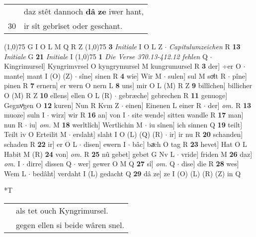 \documentclass[8pt,a4paper,notitlepage]{article}
\begin{document}
\begin{table}[ht]
\begin{minipage}[t]{0.5\linewidth}
\begin{tabular}{rl}
 & daz stêt dannoch \textbf{dâ} \textbf{ze} iwer hant,\\ 
30 & ir sît gebrîset oder geschant.\\ 
\end{tabular}
\scriptsize
\line(1,0){75} \newline
G I O L M Q R Z \newline
\line(1,0){75} \newline
\textbf{3} \textit{Initiale} I O L Z   $\cdot$ \textit{Capitulumzeichen} R  \textbf{13} \textit{Initiale} G  \textbf{21} \textit{Initiale} I  \newline
\line(1,0){75} \newline
\textbf{1} \textit{Die Verse 370.13-412.12 fehlen} Q   $\cdot$ Kingrimursel] Kyngrimvrsel O kyngrymursel M kungrumursel R \textbf{3} der] ÷er O  $\cdot$ mante] mant I (O) (Z)  $\cdot$ sîne] sinen R \textbf{4} wie] Wir M  $\cdot$ sulen] sul M soͯlt R  $\cdot$ pîne] pinen R \textbf{7} ernern] er wern O nern L \textbf{8} uns] mir O L (M) R Z \textbf{9} billîchen] billicher O (M) R Z \textbf{10} ellens] ellen O L (R)  $\cdot$ gebræche] gebrechen R \textbf{11} genuoge] Gegnvͦgen O \textbf{12} kuren] Nun R Kvm Z  $\cdot$ einen] Einenen L einer R  $\cdot$ der] \textit{om.} R \textbf{13} muoze] suln I  $\cdot$ wirz] wir R \textbf{16} an] von I  $\cdot$ site wende] sitten wandle R \textbf{17} man] nun R  $\cdot$ iu] \textit{om.} M \textbf{18} werltlîch] Wertlichin M  $\cdot$ iu sînen] ich sinnen Q \textbf{19} teilt] Teilt iv O Erteilit M  $\cdot$ erslaht] slaht I O (L) (Q) (R)  $\cdot$ ir] ir nu R \textbf{20} schanden] schaden R \textbf{22} ir] er O L  $\cdot$ disen] ewern I  $\cdot$ bâc] baͮch O tag R \textbf{23} hevet] Hat O L Habit M (R) \textbf{24} von] \textit{om.} R \textbf{25} nû gebet] gebet G Nv L  $\cdot$ vride] friden M \textbf{26} daz] \textit{om.} I  $\cdot$ dirre] dissen Q  $\cdot$ wer] gewer O M Q \textbf{27} sî] \textit{om.} Q  $\cdot$ dise] die R \textbf{28} wes] Wem L  $\cdot$ bedâht] verdaht I (L) gedacht Q \textbf{29} dâ ze] ze I (O) (L) (R) (Z) in Q \newline
\end{minipage}
\hspace{0.5cm}
\begin{minipage}[t]{0.5\linewidth}
\small
\begin{center}*T
\end{center}
\begin{tabular}{rl}
 & als tet ouch Kyngrimursel.\\ 
 & gegen ellen si beide wâren snel.\\ 

\end{tabular}
\end{minipage}
\end{table}
\end{document}
